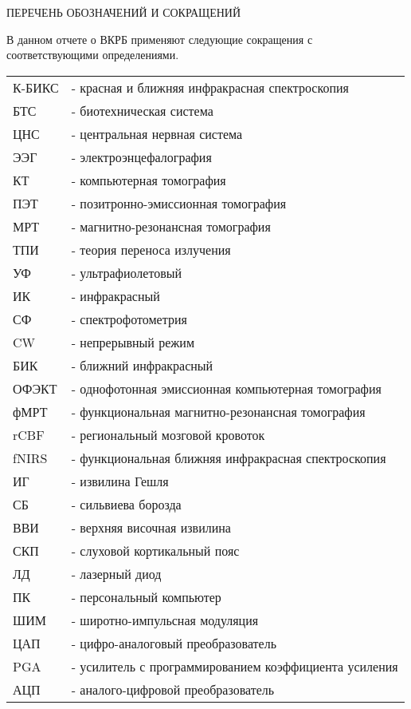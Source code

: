 \newpage\newpage
\begin{center}
ПЕРЕЧЕНЬ ОБОЗНАЧЕНИЙ И СОКРАЩЕНИЙ
\end{center}
\vspace{6mm}

В данном отчете о ВКРБ применяют следующие сокращения с соответствующими определениями.
\renewcommand{\arraystretch}{1.3}
\begin{table}[!h]
\flushleft
\begin{tabular}{l l}

К-БИКС &- красная и ближняя инфракрасная спектроскопия \\
БТС &- биотехническая система\\
ЦНС &- центральная нервная система\\
ЭЭГ &- электроэнцефалография \\
КТ &- компьютерная томография \\
ПЭТ &- позитронно-эмиссионная томография \\
МРТ &- магнитно-резонансная томография \\
ТПИ & - теория переноса излучения \\
УФ  &- ультрафиолетовый \\
ИК &- инфракрасный \\
СФ &- спектрофотометрия \\
CW &- непрерывный режим \\
БИК &- ближний инфракрасный \\
ОФЭКТ &- однофотонная эмиссионная компьютерная томография \\
фМРТ &- функциональная магнитно-резонансная томография \\
rCBF &- региональный мозговой кровоток \\
fNIRS &- функциональная ближняя инфракрасная спектроскопия\\
ИГ &- извилина Гешля \\
СБ &- сильвиева борозда \\
ВВИ &- верхняя височная извилина \\
СКП &- слуховой кортикальный пояс \\ 
ЛД &- лазерный диод \\
ПК &- персональный компьютер \\
ШИМ &- широтно-импульсная модуляция \\ 
ЦАП &- цифро-аналоговый преобразователь\\
PGA &- усилитель с программированием коэффициента усиления \\
АЦП &- аналого-цифровой преобразователь \\
\end{tabular}
\label{tab:my_label}
\end{table}
